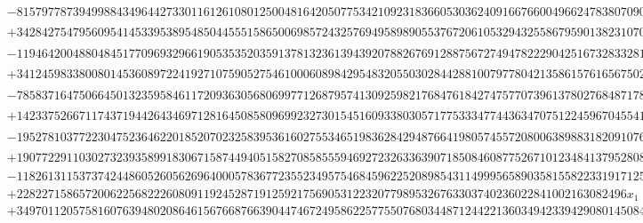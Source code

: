 \documentclass[preprint,12pt,authoryear]{elsarticle}
\begin{document}
{\begin{align*}
  &-815797787394998843496442733011612610801250048164205077534210923183660530362409166766004966247838070909131717313x_5^9\\
  &+342842754795609541453395389548504455515865006985724325769495898905537672061053294325586795901382310703074484590x_5^8\\
  &-119464200488048451770969329661905353520359137813236139439207882676912887567274947822290425167328332819674138255x_5^7\\
  &+34124598338008014536089722419271075905275461000608984295483205503028442881007977804213586157616567502762395862x_5^6\\
  &-7858371647506645013235958461172093630568069977126879574130925982176847618427475770739613780276848717890340861x_5^5\\
  &+1423375266711743719442643469712816450858096992327301545160933803057177533347744363470751224596704554150864598x_5^4\\
  &-195278103772230475236462201852070232583953616027553465198362842948766419805745572080063898831820910760883150x_5^3\\
  &+19077229110302732393589918306715874494051582708585559469272326336390718508460877526710123484137952808852276x_5^2\\
  &-1182613115373742448605260562696400057836772355234957546845962252089854311499956589035815582233191712586248x_5\\
  &+22822715865720062256822260809119245287191259217569053122320779895326763303740236022841002163082496x_1\\
  &+34970112057581607639480208646156766876639044746724958622577550768034487124422136034942339429080145084988.
\end{align*}
}


 

\end{document}
